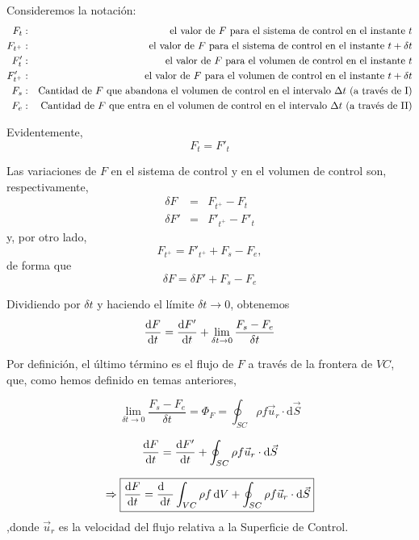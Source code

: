 Consideremos la notación: \textcolor{black}{\scriptsize{}
	\begin{eqnarray*}
		F_{t} & : & \text{el valor de \ensuremath{F} para el sistema de control en el instante \ensuremath{t}}\\
		F_{t^{+}} & : & \text{el valor de \ensuremath{F} para el sistema de control en el instante \ensuremath{t+\delta t}}\\
		F'_{t} & : & \text{el valor de \ensuremath{F} para el volumen de control en el instante \ensuremath{t}}\\
		F'_{t^{+}} & : & \text{el valor de \ensuremath{F} para el volumen de control en el instante \ensuremath{t+\delta t}}\\
		F_{s} & : & \text{Cantidad de \ensuremath{F} que abandona el volumen de control en el intervalo \ensuremath{\Delta t} (a través de I)}\\
		F_{e} & : & \text{Cantidad de \ensuremath{F} que entra en el volumen de control en el intervalo \ensuremath{\Delta t} (a través de II)}
	\end{eqnarray*}
}{\scriptsize\par}

Evidentemente, 
\[
F_{t}=F'_{t}
\]


	
	Las variaciones de $F$ en el sistema de control y en el volumen de
	control son, respectivamente, 
	\begin{eqnarray*}
		\delta F & = & F_{t^{+}}-F_{t}\\
		\delta F' & = & F'_{t^{+}}-F'_{t}
	\end{eqnarray*}
	y, por otro lado, 
	\[
	F_{t^{+}}=F'_{t^{+}}+F_{s}-F_{e},
	\]
	de forma que 
	\[
	\delta F=\delta F'+F_{s}-F_{e}
	\]
	
	Dividiendo por $\delta t$ y haciendo el límite $\delta t\rightarrow0$,
	obtenemos 
	\[
	\frac{\textrm{d} F}{\textrm{d} t}=\frac{\textrm{d} F'}{\textrm{d} t}+\lim_{\delta t\rightarrow0}\frac{F_{s}-F_{e}}{\delta t}
	\]
	

	
	Por definición, el último término es el flujo de $F$ a través de
	la frontera de $VC$, que, como hemos definido en temas anteriores,
	
	\[
	\lim_{\delta t\rightarrow0}\frac{F_{s}-F_{e}}{\delta t}=\Phi_{F}=\oint_{SC}\rho f\vec{u}_{r}\cdot\text{d}\vec{S}
	\]
	
	\[
	\frac{\textrm{d} F}{\textrm{d} t}=\frac{\textrm{d} F'}{\textrm{d} t}+\oint_{SC}\rho f\vec{u}_{r}\cdot\text{d}\vec{S}
	\]
	

\begin{equation}
		\Rightarrow\boxed{\frac{\textrm{d} F}{\textrm{d} t}=\frac{\textrm{d} \phantom{F}}{\textrm{d} t}\int_{VC}\rho f\,\text{d}V+\oint_{SC}\rho f\vec{u}_{r}\cdot\text{d}\vec{S}}
\end{equation}
	,donde $\vec{u}_{r}$ es la velocidad del flujo relativa a la Superficie
	de Control.\\
	

